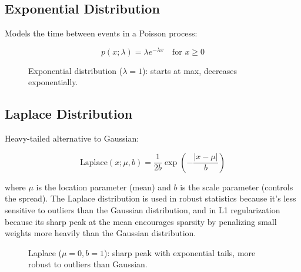 \subsection{Exponential Distribution}

Models the time between events in a Poisson process:

\begin{equation}
p(x; \lambda) = \lambda e^{-\lambda x} \quad \text{for } x \geq 0
\end{equation}

\begin{figure}[h]
\centering
{}
\caption{Exponential distribution ($\lambda=1$): starts at max, decreases exponentially.}
\label{fig:exponential-distribution}
\end{figure}

\subsection{Laplace Distribution}

Heavy-tailed alternative to Gaussian:

\begin{equation}
\text{Laplace}(x; \mu, b) = \frac{1}{2b} \exp\left(-\frac{|x-\mu|}{b}\right)
\end{equation}

where $\mu$ is the location parameter (mean) and $b$ is the scale parameter (controls the spread). The Laplace distribution is used in robust statistics because it's less sensitive to outliers than the Gaussian distribution, and in L1 regularization because its sharp peak at the mean encourages sparsity by penalizing small weights more heavily than the Gaussian distribution.

\begin{figure}[h]
\centering
{}
\caption{Laplace ($\mu=0, b=1$): sharp peak with exponential tails, more robust to outliers than Gaussian.}
\label{fig:laplace-distribution}
\end{figure}

